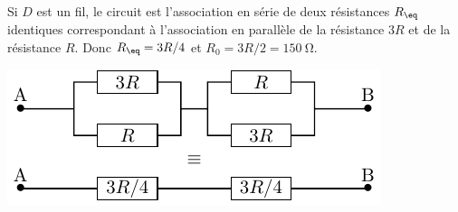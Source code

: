\documentclass[a4paper, 10pt, garamond, oneside]{book}
\begin{document}
{\begin{enumerate}
\begin{minipage}{0.6\linewidth}
			      Si $D$ est un fil, le circuit est l'association en série de deux
			      résistances $R_{\eq}$ identiques correspondant à l'association en
			      parallèle de la résistance $3R$ et de la résistance $R$.
			      Donc $R_{\eq}=3R/4$ et $\boxed{R_0=3R/2=\SI{150}{\ohm}}$.
		      \end{minipage}
		      \begin{minipage}{0.4\linewidth}
			      \begin{center}
				      \includegraphics[width=\linewidth]{diplin_q2}
			      \end{center}
		      \end{minipage}
	\end{enumerate}
}
\end{document}
